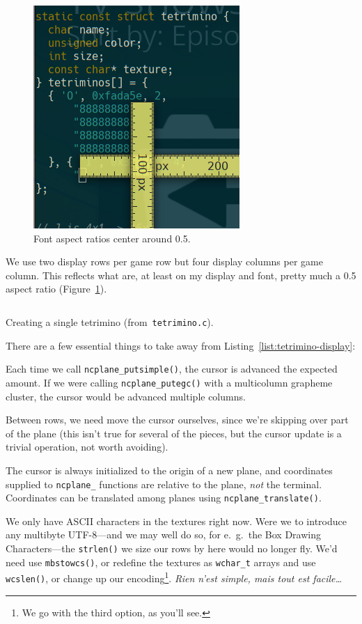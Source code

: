 \begin{figure}[!htbp]
\centering \includegraphics[width=.5\linewidth]{media/screenruler.png}
\caption{Font aspect ratios center around 0.5.}
\label{fig:aspectratio}
\end{figure}

We use two display rows per game row but four display columns per game column.
This reflects what are, at least on my display and font, pretty much a 0.5
aspect ratio (Figure~\ref{fig:aspectratio}).

\begin{listing}[!htbp]
\inputminted[]{C}{code/tetrimino-display.h}
\caption{Creating a single tetrimino (from~\texttt{tetrimino.c}).}
\label{list:tetrimino-display}
\end{listing}

There are a few essential things to
take away from Listing~\ref{list:tetrimino-display}:

\begin{denseitemize}
\item{Each time we call \texttt{ncplane\_putsimple()}, the cursor is advanced
      the expected amount. If we were calling \texttt{ncplane\_putegc()} with
      a multicolumn grapheme cluster, the cursor would be advanced multiple
      columns.}
\item{Between rows, we need move the cursor ourselves, since we're skipping over
      part of the plane (this isn't true for several of the pieces, but the
      cursor update is a trivial operation, not worth avoiding).}
\item{The cursor is always initialized to the origin of a new plane, and coordinates
      supplied to \texttt{ncplane\_} functions are relative to the plane,
      \textit{not} the terminal. Coordinates can be translated among planes
      using \texttt{ncplane\_translate()}.}
\item{We only have ASCII characters in the textures right now. Were we to
      introduce any multibyte UTF-8---and we may well do so, for e.\ g.\ the
      Box Drawing Characters---the \texttt{strlen()} we size our rows by here
      would no longer fly. We'd need use \texttt{mbstowcs()}, or redefine the
      textures as \texttt{wchar\_t} arrays and use \texttt{wcslen()},
      or change up our encoding\footnote{We go with the third option, as you'll see.}. \textfrench{\textit{Rien n'est simple, mais tout est facile\ldots}}}
\end{denseitemize}

